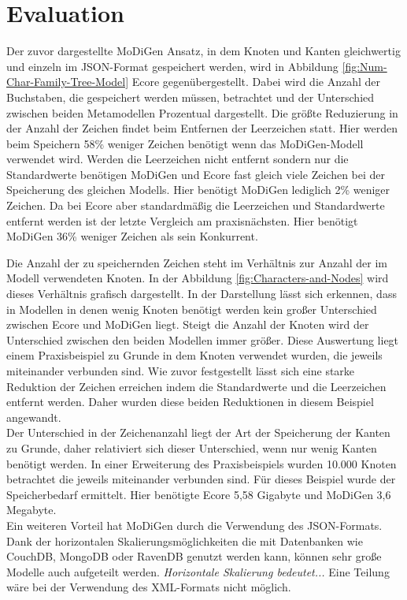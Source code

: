 \section{Evaluation} \label{sec:evaluation}
Der zuvor dargestellte MoDiGen Ansatz, in dem Knoten und Kanten gleichwertig und einzeln im JSON-Format gespeichert werden, wird in Abbildung \ref{fig:Num-Char-Family-Tree-Model} Ecore gegenübergestellt. Dabei wird die Anzahl der Buchstaben, die gespeichert werden müssen, betrachtet und der Unterschied zwischen beiden Metamodellen Prozentual dargestellt. Die größte Reduzierung in der Anzahl der Zeichen findet beim Entfernen der Leerzeichen statt. Hier werden beim Speichern 58\% weniger Zeichen benötigt wenn das MoDiGen-Modell verwendet wird. Werden die Leerzeichen nicht entfernt sondern nur die Standardwerte benötigen MoDiGen und Ecore fast gleich viele Zeichen bei der Speicherung des gleichen Modells. Hier benötigt MoDiGen lediglich 2\% weniger Zeichen. Da bei Ecore aber standardmäßig die Leerzeichen und Standardwerte entfernt werden ist der letzte Vergleich am praxisnächsten. Hier benötigt MoDiGen 36\% weniger Zeichen als sein Konkurrent.

Die Anzahl der zu speichernden Zeichen steht im Verhältnis zur Anzahl der im Modell verwendeten Knoten. 
In der Abbildung \ref{fig:Characters-and-Nodes} wird dieses Verhältnis grafisch dargestellt. In der Darstellung lässt sich erkennen, dass in Modellen in denen wenig Knoten benötigt werden kein großer Unterschied zwischen Ecore und MoDiGen liegt. Steigt die Anzahl der Knoten wird der Unterschied zwischen den beiden Modellen immer größer. Diese Auswertung liegt einem Praxisbeispiel zu Grunde in dem Knoten verwendet wurden, die jeweils miteinander verbunden sind. Wie zuvor festgestellt lässt sich eine starke Reduktion der Zeichen erreichen indem die Standardwerte und die Leerzeichen entfernt werden. Daher wurden diese beiden Reduktionen in diesem Beispiel angewandt.\\
Der Unterschied in der Zeichenanzahl liegt der Art der Speicherung der Kanten zu Grunde, daher relativiert sich dieser Unterschied, wenn nur wenig Kanten benötigt werden. In einer Erweiterung des Praxisbeispiels wurden 10.000 Knoten betrachtet die jeweils miteinander verbunden sind. Für dieses Beispiel wurde der Speicherbedarf ermittelt. Hier benötigte Ecore 5,58 Gigabyte und MoDiGen 3,6 Megabyte.\\
Ein weiteren Vorteil hat MoDiGen durch die Verwendung des JSON-Formats. Dank der horizontalen Skalierungsmöglichkeiten die mit Datenbanken wie CouchDB, MongoDB oder RavenDB genutzt werden kann, können sehr große Modelle auch aufgeteilt werden. \textit{Horizontale Skalierung bedeutet...} Eine Teilung wäre bei der Verwendung des XML-Formats nicht möglich. 


